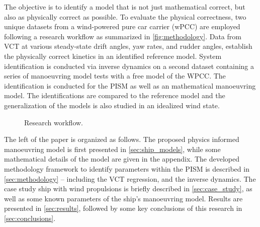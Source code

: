 The objective is to identify a model that is not just mathematical correct, but also as physically correct as possible.
To evaluate the physical correctness, two unique datasets from a wind-powered pure car carrier (wPCC) are employed following a research workflow as summarized in \autoref{fig:methodology}.
Data from VCT at various steady-state drift angles, yaw rates, and rudder angles, establish the physically correct kinetics in an identified reference model. 
System identification is conducted via inverse dynamics \citep{faber_inverse_2018} on a second dataset containing a series of manoeuvring model tests with a free model of the WPCC. The identification is conducted for the PISM as well as an mathematical manoeuvring model. The identifications are compared to the reference model and the generalization of the models is also studied in an idealized wind state.
%
\begin{figure}[h]
  \centering
  
  \caption{Research workflow.}
  \label{fig:methodology}
\end{figure}

The left of the paper is organized as follows. The proposed physics informed manoeuvring model is first presented in \autoref{sec:ship_models}, while some mathematical details of the model are given in the appendix. 
The developed methodology framework to identify parameters within the PISM is described in \autoref{sec:methodology} -- including the VCT regression, and the inverse dynamics. The case study ship with wind propulsions is briefly described in \autoref{sec:case_study}, as well as some known parameters of the ship's manoeuvring model. Results are presented in \autoref{sec:results}, followed by some key conclusions of this research in \autoref{sec:conclusions}.